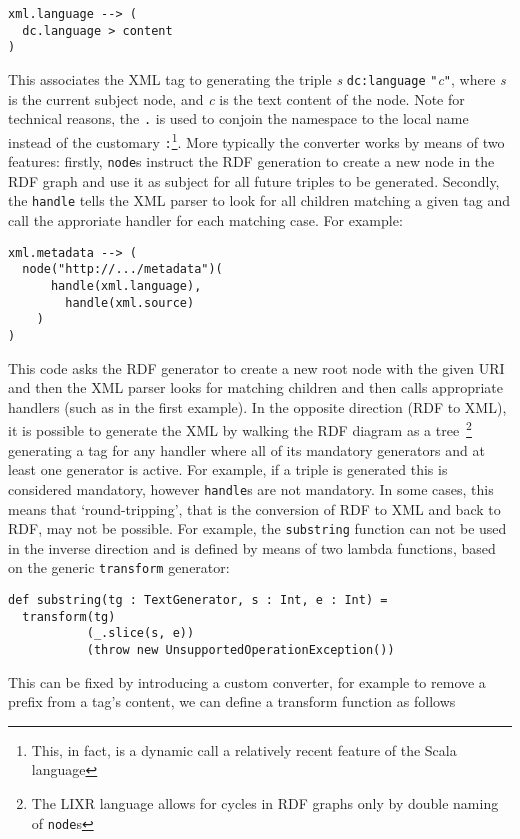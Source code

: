 \documentclass{acm_proc_article-sp}
\begin{document}
\begin{verbatim}
xml.language --> (
  dc.language > content
)
\end{verbatim}

This associates the XML tag {\tt <xml:language>} to
generating the triple \emph{s} {\tt dc:language} {\tt "}\emph{c}{\tt "}, 
where \emph{s} is the current subject node, and \emph{c} is the text content of
the node. Note for technical reasons, the {\tt .} is used to conjoin the namespace
to the local name instead of the customary {\tt :}\footnote{This, in fact, is 
a dynamic call a relatively recent feature of the Scala language}. More typically
the converter works by means of two features: firstly, {\tt node}s instruct the RDF generation
to create a new node in the RDF graph and use it as subject for all future triples
to be generated. Secondly, the {\tt handle} tells the XML parser to look for all 
children matching a given tag and call the approriate handler for each matching
case. For example:

\begin{verbatim}
xml.metadata --> (
  node("http://.../metadata")(
	  handle(xml.language),
		handle(xml.source)
	)
)
\end{verbatim}

This code asks the RDF generator to create a new root node with the given URI and
then the XML parser looks for matching children and then calls appropriate handlers
(such as in the first example). In the opposite direction (RDF to XML), it is
possible to generate the XML by walking the RDF diagram as a tree~\footnote{
The LIXR language allows for cycles in RDF graphs only by double naming of
{\tt node}s} generating a
tag for any handler where all of its mandatory generators and at least one 
generator is active. For example, if a triple is generated this is considered
mandatory, however {\tt handle}s are not mandatory. In some cases, this means that
`round-tripping', that is the conversion of RDF to XML and back to RDF, may not
be possible. For example, the {\tt substring} function can not be used in the
inverse direction and is defined by means of two lambda functions, based on
the generic {\tt transform} generator:

\begin{verbatim}
def substring(tg : TextGenerator, s : Int, e : Int) =
  transform(tg)
           (_.slice(s, e))
           (throw new UnsupportedOperationException())
\end{verbatim}

This can be fixed by introducing a custom converter, for example to remove a 
prefix from a tag's content, we can define a transform function as follows
\end{document}
